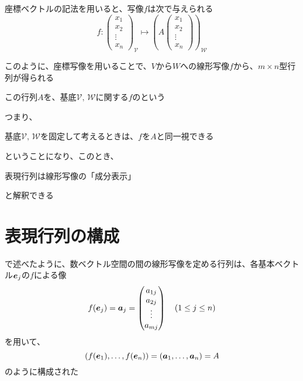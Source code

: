 \documentclass[../../../topic_linear-algebra]{subfiles}
\begin{document}
\begin{center}
\end{center}

\br

座標ベクトルの記法を用いると、写像$f$は次で与えられる
\begin{equation*}
  f\colon \begin{pmatrix}
    x_1    \\
    x_2    \\
    \vdots \\
    x_n
  \end{pmatrix}_{\mathcal{V}}
  \mapsto \left( A \begin{pmatrix}
      x_1    \\
      x_2    \\
      \vdots \\
      x_n
    \end{pmatrix} \right)_\mathcal{W}
\end{equation*}

\sectionline

このように、座標写像を用いることで、$V$から$W$への線形写像$f$から、$m \times n$型行列が得られる

この行列$A$を、基底$\mathcal{V}, \, \mathcal{W}$に関する$f$のという

\br

つまり、
\begin{shaded}
  基底$\mathcal{V}, \, \mathcal{W}$を固定して考えるときは、$f$を$A$と同一視できる
\end{shaded}
ということになり、このとき、
\begin{shaded}
  表現行列は線形写像の「成分表示」
\end{shaded}
と解釈できる

\sectionline
\section{表現行列の構成}\label{sec:construction-of-matrix-rep}

で述べたように、数ベクトル空間の間の線形写像を定める行列は、各基本ベクトル$\vb*{e}_j$の$f$による像
\begin{equation*}
  f(\vb*{e}_j) = \vb*{a}_j = \begin{pmatrix}
    a_{1j} \\
    a_{2j} \\
    \vdots \\
    a_{mj}
  \end{pmatrix} \quad (1 \leq j \leq n)
\end{equation*}
を用いて、
\begin{equation*}
  \left( f(\vb*{e}_1), \ldots, f(\vb*{e}_n) \right) = \left( \vb*{a}_1, \ldots, \vb*{a}_n \right) = A
\end{equation*}
のように構成された
\end{document}
